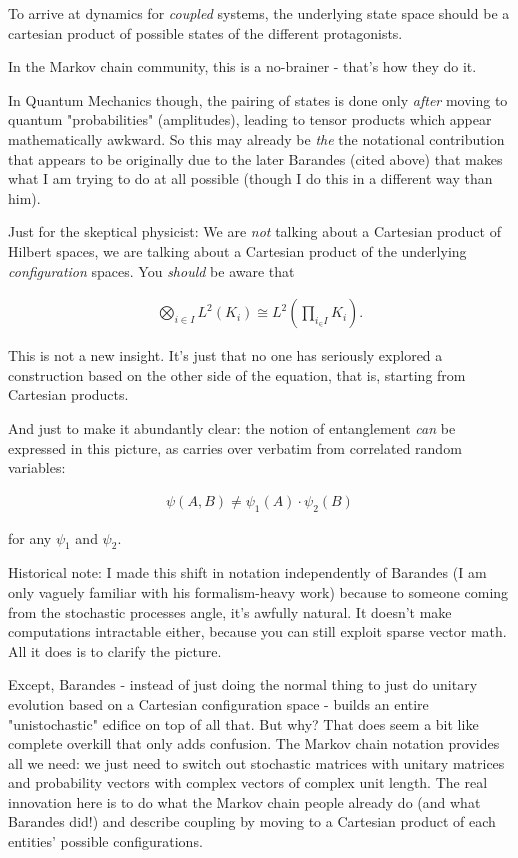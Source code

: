 \documentclass{article}
\begin{document}
To arrive at dynamics for \textit{coupled} systems, the underlying state space should be a cartesian product of possible states of the different protagonists.

In the Markov chain community, this is a no-brainer - that's how they do it.

In Quantum Mechanics though, the pairing of states is done only \textit{after} moving to quantum "probabilities" (amplitudes), leading to tensor products which appear mathematically awkward. So this may already be \textit{the} the notational contribution that appears to be originally due to the later Barandes (cited above) that makes what I am trying to do at all possible (though I do this in a different way than him).

Just for the skeptical physicist: We are \textit{not} talking about a Cartesian product of Hilbert spaces, we are talking about a Cartesian product of the underlying \textit{configuration} spaces. You \textit{should} be aware that 

\begin{align*}
\bigotimes_{i \in I} L^2(K_i) \cong L^2(\prod_{i_\in I}K_i).
\end{align*}

This is not a new insight. It's just that no one has seriously explored a construction based on the other side of the equation, that is, starting from Cartesian products.

And just to make it abundantly clear: the notion of entanglement \textit{can} be expressed in this picture, as carries over verbatim from correlated random variables:

\begin{align*}
\psi(A, B) \neq \psi_1(A) \cdot \psi_2(B)
\end{align*}

for any $\psi_1$ and $\psi_2$.

Historical note: I made this shift in notation independently of Barandes (I am only vaguely familiar with his formalism-heavy work) because to someone coming from the stochastic processes angle, it's awfully natural. It doesn't make computations intractable either, because you can still exploit sparse vector math. All it does is to clarify the picture.

Except, Barandes - instead of just doing the normal thing to just do unitary evolution based on a Cartesian configuration space - builds an entire "unistochastic" edifice on top of all that. But why? That does seem a bit like complete overkill that only adds confusion. The Markov chain notation provides all we need: we just need to switch out stochastic matrices with unitary matrices and probability vectors with complex vectors of complex unit length. The real innovation here is to do what the Markov chain people already do (and what Barandes did!) and describe coupling by moving to a Cartesian product of each entities' possible configurations.
\end{document}
